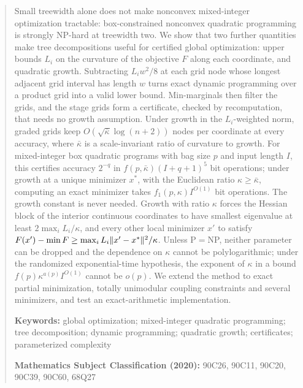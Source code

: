 \begin{abstract}
Small treewidth alone does not make nonconvex mixed-integer optimization
tractable: box-constrained nonconvex quadratic programming is strongly
NP-hard at treewidth two. We show that two further quantities make tree
decompositions useful for certified global optimization: upper bounds $L_i$
on the curvature of the objective $F$ along each coordinate, and quadratic
growth. Subtracting $L_iw^2/8$ at each grid node whose longest adjacent grid
interval has length $w$ turns exact dynamic programming over a product grid
into a valid lower bound. Min-marginals then filter the grids, and the stage
grids form a certificate, checked by recomputation, that needs no growth
assumption. Under growth in the $L_i$-weighted norm, graded grids keep
$O(\sqrt{\bar\kappa}\log(n+2))$ nodes per coordinate at every accuracy,
where $\bar\kappa$ is a scale-invariant ratio of curvature to growth. For
mixed-integer box quadratic programs with bag size $p$ and input length $I$,
this certifies accuracy $2^{-q}$ in $f(p,\bar\kappa)(I+q+1)^5$ bit
operations; under growth at a unique minimizer $x^*$, with the Euclidean
ratio $\kappa\ge\bar\kappa$, computing an exact minimizer takes
$f_1(p,\kappa)I^{O(1)}$ bit operations. The growth constant is never
needed. Growth with ratio $\kappa$ forces the Hessian block of the interior continuous
coordinates to have smallest eigenvalue at least $2\max_iL_i/\kappa$, and
every other local minimizer $x'$ to satisfy
$F(x')-\min F\ge\max_iL_i\norm{x'-x^*}^2/\kappa$. Unless P${}={}$NP,
neither parameter can be dropped and the dependence on $\kappa$ cannot be polylogarithmic;
under the randomized exponential-time hypothesis, the exponent of $\kappa$
in a bound $f(p)\kappa^{a(p)}I^{O(1)}$ cannot be $o(p)$. We extend the
method to exact partial minimization, totally unimodular coupling
constraints and several minimizers, and test an exact-arithmetic
implementation.
\par\medskip\noindent\textbf{Keywords:} global optimization; mixed-integer quadratic
programming; tree decomposition; dynamic programming; quadratic growth; certificates;
parameterized complexity
\par\noindent\textbf{Mathematics Subject Classification (2020):} 90C26, 90C11, 90C20, 90C39,
90C60, 68Q27
\end{abstract}
